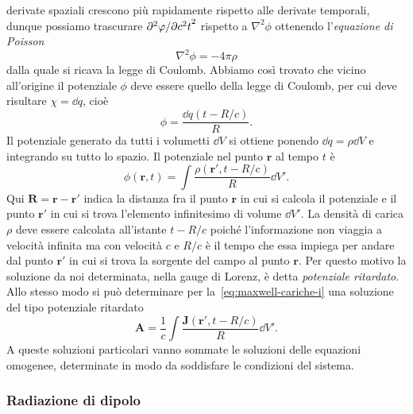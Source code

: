 derivate spaziali crescono più rapidamente rispetto alle derivate temporali,
dunque possiamo trascurare $\lparder[2]{\phi}{c^{2}t}$ rispetto a
$\nabla^{2} \phi$ ottenendo 
l'\emph{equazione di Poisson}
\begin{equation}
  \nabla^{2} \phi = -4\pi\rho
\end{equation}
dalla quale si ricava la legge di Coulomb.  Abbiamo così trovato che vicino
all'origine il potenziale $\phi$ deve essere quello della legge di Coulomb, per
cui deve risultare $\chi = \dd q$, cioè
\begin{equation}
  \phi = \frac{\dd q(t - R/c)}{R}.
\end{equation}
Il potenziale generato da tutti i volumetti $\dd V$ si ottiene ponendo
$\dd q = \rho\dd V$ e integrando su tutto lo spazio.  Il potenziale nel punto
$\bm{r}$ al tempo $t$ è
\begin{equation}
  \label{eq:potenz-rit-phi}
  \phi(\bm{r}, t) = \int \frac{\rho(\bm{r}', t - R/c)}{R} \dd V'.
\end{equation}
Qui $\bm{R} = \bm{r} - \bm{r}'$ indica la distanza fra il punto $\bm{r}$ in cui
si calcola il potenziale e il punto $\bm{r}'$ in cui si trova l'elemento
infinitesimo di volume $\dd V'$.  La densità di carica $\rho$ deve essere
calcolata all'istante $t - R/c$ poiché l'informazione non viaggia a velocità
infinita ma con velocità $c$ e $R/c$ è il tempo che essa impiega per andare dal
punto $\bm{r}'$ in cui si trova la sorgente del campo al punto $\bm{r}$.  Per
questo motivo la soluzione da noi determinata, nella gauge di Lorenz, è detta
\emph{potenziale ritardato}.  Allo stesso modo si
può determinare per la~\eqref{eq:maxwell-cariche-i} una soluzione del tipo
potenziale ritardato
\begin{equation}
  \label{eq:potenz-rit-A}
  \bm{A} = \frac{1}{c} \int \frac{\bm{J}(\bm{r}',t - R/c )}{R} \dd V'.
\end{equation}
A queste soluzioni particolari vanno sommate le soluzioni delle equazioni
omogenee, determinate in modo da soddisfare le condizioni del sistema.

\subsubsection{Radiazione di dipolo}
\label{sec:radiazione-dipolo}

